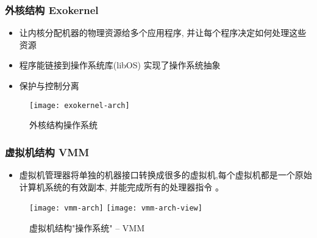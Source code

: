\begin{frame}
	
	\frametitle{外核结构 Exokernel}
	
	\begin{itemize}
		\item 让内核分配机器的物理资源给多个应用程序, 并让每个程序决定如何处理这些资源
		\item 程序能链接到操作系统库(libOS) 实现了操作系统抽象
		\item 保护与控制分离
	\end{itemize}
	\begin{figure}
		\centering
		\texttt{[image: exokernel-arch]}
		\caption{外核结构操作系统}
	\end{figure}
	
\end{frame}

\begin{frame}
	
	\frametitle{虚拟机结构 VMM}
	
	\begin{itemize}
		\item 虚拟机管理器将单独的机器接口转换成很多的虚拟机,每个虚拟机都是一个原始计算机系统的有效副本, 并能完成所有的处理器指令 。
	\end{itemize}
	\begin{figure}
		\centering
		\texttt{[image: vmm-arch]}
		\texttt{[image: vmm-arch-view]}
		\caption{虚拟机结构"操作系统" -- VMM}
	\end{figure}
	
\end{frame}


